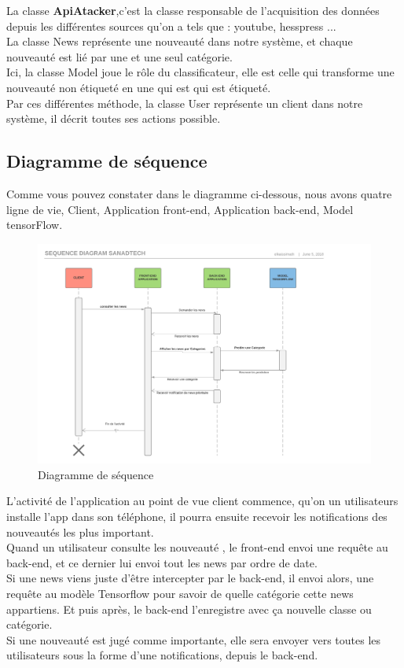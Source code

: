 La classe \textbf{ApiAtacker},c'est la classe responsable de l'acquisition des données depuis les différentes sources qu'on a tels que : youtube, hesspress ...\\[0.2cm]
La classe News représente une nouveauté dans notre système, et chaque nouveauté est lié par une et une seul catégorie.\\[0.2cm]
Ici, la classe Model joue le rôle du classificateur, elle est celle qui transforme une nouveauté non étiqueté en une qui est qui est  étiqueté.\\[0.2cm]
Par ces différentes méthode, la classe User représente un client dans notre système, il décrit toutes ses actions possible.

\subsection{Diagramme de séquence}
Comme vous pouvez constater dans le diagramme ci-dessous, nous avons quatre ligne de vie, Client, Application front-end, Application back-end, Model tensorFlow.
\begin{figure}[H]
	\includegraphics[width=\linewidth]{Images/Sequence_Diagram_Sanadtech.png}
	\caption{Diagramme de séquence}
	\label{fig:sequence}
\end{figure}
L'activité de l'application au point de vue client commence, qu'on un utilisateurs installe l'app dans son téléphone, il pourra ensuite recevoir les notifications des nouveautés les plus important.\\[0.2cm]
Quand un utilisateur consulte les nouveauté , le front-end envoi une requête au back-end, et ce dernier lui envoi tout les news par ordre de date.\\[0.2cm]
Si une news viens juste d'être intercepter par le back-end, il envoi alors, une requête au modèle Tensorflow pour savoir de quelle catégorie cette news appartiens. Et puis après, le back-end l'enregistre avec ça nouvelle classe ou catégorie.\\[0.4cm]
Si une nouveauté est jugé comme importante, elle sera envoyer vers toutes les utilisateurs sous la forme d'une notifications, depuis le back-end.\\[0.2cm]

